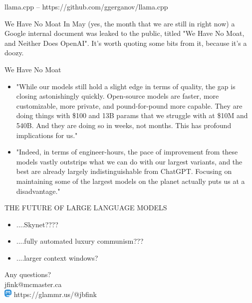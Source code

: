 \documentclass{beamer}
\begin{document}
\begin{frame}
	llama.cpp -- https://github.com/ggerganov/llama.cpp
\end{frame}





\begin{frame}{We Have No Moat}
	In May (yes, the month that we are still in right now) a Google internal document was leaked to the public, titled "We Have No Moat, and Neither Does OpenAI". It's worth quoting some bits from it, because it's a doozy.
\end{frame}

\begin{frame}{We Have No Moat}
	\begin{itemize}
		\item "While our models still hold a slight edge in terms of quality, the gap is closing astonishingly quickly. Open-source models are faster, more customizable, more private, and pound-for-pound more capable. They are doing things with \$100 and 13B params that we struggle with at \$10M and 540B. And they are doing so in weeks, not months. This has profound implications for us."
		\pause
		\item "Indeed, in terms of engineer-hours, the pace of improvement from these models vastly outstrips what we can do with our largest variants, and the best are already largely indistinguishable from ChatGPT. Focusing on maintaining some of the largest models on the planet actually puts us at a disadvantage."
	\end{itemize}
\end{frame}

\begin{frame}{THE FUTURE OF LARGE LANGUAGE MODELS}
	\begin{itemize}
		\item ....Skynet????
		\pause
		\item ....fully automated luxury communism???
		\pause 
		\item ....larger context windows?
		
	\end{itemize}
	
	
	
\end{frame}

\begin{frame}
	Any questions?\\ 
	jfink@mcmaster.ca\\
	\includegraphics[left, height=4mm]{mastodon} \hspace{1mm}  https://glammr.us/@jbfink
	
\end{frame}
\end{document}
